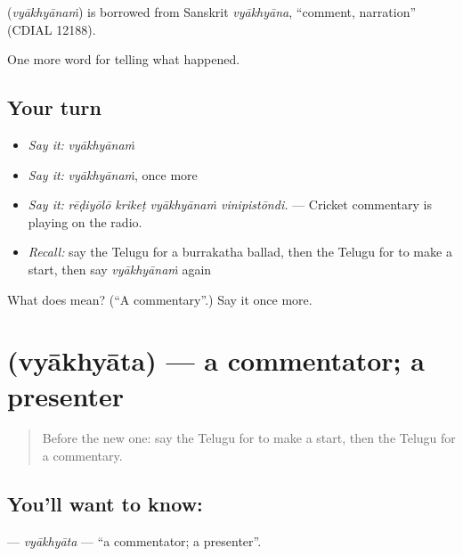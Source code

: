 \begin{cousinweb}
\textbf{} (\emph{vyākhyānaṁ}) is borrowed from Sanskrit \emph{vyākhyāna}, \textquotedblleft{}comment, narration\textquotedblright{} (CDIAL 12188).
\end{cousinweb}

\begin{grammarlens}[title={What you've built}]
One more word for telling what happened.
\end{grammarlens}

\subsection*{Your turn}
\begin{itemize}
\raggedright
  \item \emph{Say it:} \emph{vyākhyānaṁ}
  \item \emph{Say it:} \emph{vyākhyānaṁ}, once more
  \item \emph{Say it:} \emph{rēḍiyōlō krikeṭ vyākhyānaṁ vinipistōndi.} — Cricket commentary is playing on the radio.
  \item \emph{Recall:} say the Telugu for a burrakatha ballad, then the Telugu for to make a start, then say \emph{vyākhyānaṁ} again
\end{itemize}

\begin{tcolorbox}[breakable,colback=teal!4,colframe=teal!35!black,title={Before you move on}]
What does  mean? (\textquotedblleft{}A commentary\textquotedblright{}.) Say it once more.
\end{tcolorbox}
\section[\texorpdfstring{\te{వ్యాఖ్యాత} (vyākhyāta)}{వ్యాఖ్యాత (vyākhyāta)}]{ (vyākhyāta) — a commentator; a presenter}

\label{lesson:TE-C374-vyakhyata}



\begin{quote}
Before the new one: say the Telugu for to make a start, then the Telugu for a commentary.
\end{quote}

\subsection*{You'll want to know: }
\textbf{} — \emph{vyākhyāta} — \textquotedblleft{}a commentator; a presenter\textquotedblright{}.

